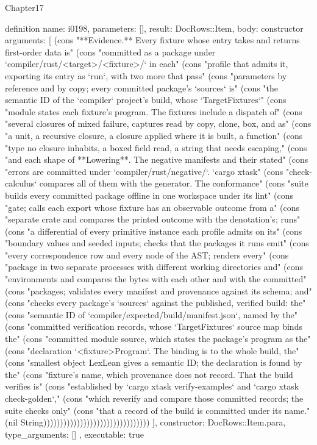 \begin{lexlean}{Chapter17}
\begin{semanticmodule}
definition{
  name: i0198,
  parameters: [],
  result: DocRows::Item,
  body: constructor{
    arguments: [
      (cons "**Evidence.** Every fixture whose entry takes and returns first-order data is" (cons "committed as a package under `compiler/rust/<target>/<fixture>/` in each" (cons "profile that admits it, exporting its entry as `run`, with two more that pass" (cons "parameters by reference and by copy; every committed package's `sources` is" (cons "the semantic ID of the `compiler` project's build, whose `TargetFixtures`" (cons "module states each fixture's program. The fixtures include a dispatch of" (cons "several closures of mixed failure, captures read by copy, clone, box, and as" (cons "a unit, a recursive closure, a closure applied where it is built, a function" (cons "type no closure inhabits, a boxed field read, a string that needs escaping," (cons "and each shape of **Lowering**. The negative manifests and their stated" (cons "errors are committed under `compiler/rust/negative/`. `cargo xtask" (cons "check-calculus` compares all of them with the generator. The conformance" (cons "suite builds every committed package offline in one workspace under its lint" (cons "gate; calls each export whose fixture has an observable outcome from a" (cons "separate crate and compares the printed outcome with the denotation's; runs" (cons "a differential of every primitive instance each profile admits on its" (cons "boundary values and seeded inputs; checks that the packages it runs emit" (cons "every correspondence row and every node of the AST; renders every" (cons "package in two separate processes with different working directories and" (cons "environments and compares the bytes with each other and with the committed" (cons "packages; validates every manifest and provenance against its schema; and" (cons "checks every package's `sources` against the published, verified build: the" (cons "semantic ID of `compiler/expected/build/manifest.json`, named by the" (cons "committed verification records, whose `TargetFixtures` source map binds the" (cons "committed module source, which states the package's program as the" (cons "declaration `<fixture>Program`. The binding is to the whole build, the" (cons "smallest object LexLean gives a semantic ID; the declaration is found by the" (cons "fixture's name, which provenance does not record. That the build verifies is" (cons "established by `cargo xtask verify-examples` and `cargo xtask check-golden`," (cons "which reverify and compare those committed records; the suite checks only" (cons "that a record of the build is committed under its name." (nil String))))))))))))))))))))))))))))))))
    ],
    constructor: DocRows::Item.para,
    type_arguments: []
  },
  executable: true
}


\end{semanticmodule}
\end{lexlean}
